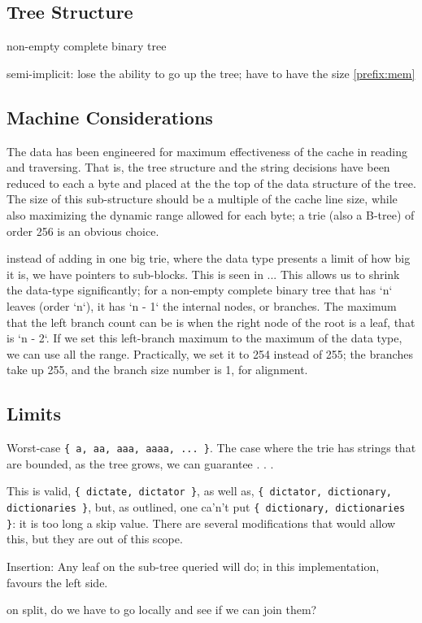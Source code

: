 \documentclass[12pt]{article}
\newcommand{\code}[1]{\colorbox{light-gray}{\texttt{#1}}}
\begin{document}
\subsection{Tree Structure}

non-empty complete binary tree

semi-implicit: lose the ability to go up the tree; have to have the size \ref{prefix:mem}

\subsection{Machine Considerations}

The data has been engineered for maximum effectiveness of the cache in reading and traversing. That is, the tree structure and the string decisions have been reduced to each a byte and placed at the the top of the data structure of the tree. The size of this sub-structure should be a multiple of the cache line size, while also maximizing the dynamic range allowed for each byte; a trie (also a B-tree) of order 256 is an obvious choice.

instead of adding in one big trie, where the data type presents a limit of how big it is, we have pointers to sub-blocks. This is seen in ... This allows us to shrink the data-type significantly; for a non-empty complete binary tree that has `n` leaves (order `n`), it has `n - 1` the internal nodes, or branches. The maximum that the left branch count can be is when the right node of the root is a leaf, that is `n - 2`. If we set this left-branch maximum to the maximum of the data type, we can use all the range. Practically, we set it to 254 instead of 255; the branches take up 255, and the branch size number is 1, for alignment.

\subsection{Limits}

Worst-case \code{\{ a, aa, aaa, aaaa, ... \}}. The case where the trie has strings that are bounded, as the tree grows, we can guarantee . . .

This is valid, \code{\{ dictate, dictator \}}, as well as, \code{\{ dictator, dictionary, dictionaries \}}, but, as outlined, one ca'n't put \code{\{ dictionary, dictionaries \}}: it is too long a skip value. There are several modifications that would allow this, but they are out of this scope.

Insertion: Any leaf on the sub-tree queried will do; in this implementation, favours the left side.

on split, do we have to go locally and see if we can join them?


\end{document}
